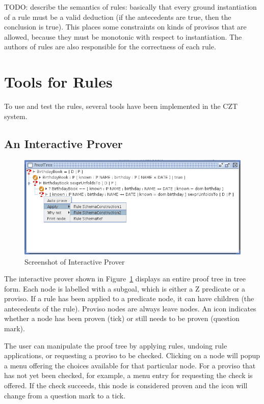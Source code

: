 \documentclass{entcs}
\begin{document}
TODO: describe the semantics of rules: basically that every ground
instantiation of a rule must be a valid deduction (if the antecedents
are true, then the conclusion is true).  This places some constraints
on kinds of provisos that are allowed, because they must be monotonic
with respect to instantiation.  The authors of rules are also
responsible for the correctness of each rule.  


\section{Tools for Rules} \label{sec:tools}

To use and test the rules, several tools have been implemented
in the CZT system.

\subsection{An Interactive Prover}

\begin{figure}[htbp]
  \centering
  \includegraphics[width=\textwidth]{cztprover1}
  \caption{Screenshot of Interactive Prover}
  \label{fig:cztprover}
\end{figure}

The interactive prover shown in Figure~\ref{fig:cztprover} displays an
entire proof tree in tree form.  Each node is labelled with a subgoal,
which is either a Z predicate or a proviso.  If a rule has been
applied to a predicate node, it can have children (the antecedents of
the rule).  Proviso nodes are always leave nodes.  An icon indicates
whether a node has been proven (tick) or still needs to be proven
(question mark).

The user can manipulate the proof tree by applying rules,
undoing rule applications, or requesting a proviso to be checked.
Clicking on a node will popup a menu offering the choices available
for that particular node.  For a proviso that has not yet been
checked, for example, a menu entry for requesting the check is
offered.  If the check succeeds, this node is considered proven and
the icon will change from a question mark to a tick.
\end{document}
